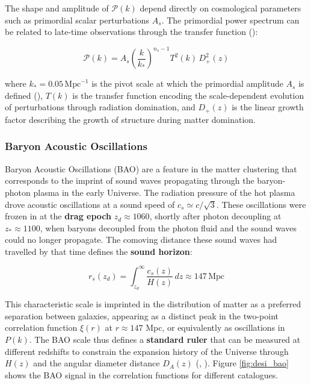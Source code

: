 The shape and amplitude of $\mathcal{P}(k)$ depend directly on cosmological parameters such as primordial scalar perturbations $A_s$. 
The primordial power spectrum can be related to late-time observations through the 
transfer function (\cite{Eisenstein_Hu_1998}):

\begin{equation}
    \mathcal{P}(k) = A_s \left(\frac{k}{k_*}\right)^{n_s - 1} T^2(k)\,D_+^2(z)
\end{equation}

\noindent where $k_* = 0.05\,\text{Mpc}^{-1}$ is the pivot scale at which the primordial amplitude $A_s$ is defined (\cite{Planck_2018_inflation}), $T(k)$ is the transfer 
function encoding the scale-dependent evolution of perturbations through radiation domination, and $D_+(z)$ is the linear growth factor describing the 
growth of structure during matter domination. \\


\subsubsection{Baryon Acoustic Oscillations}

Baryon Acoustic Oscillations (BAO) are a feature in the matter clustering that corresponds to the imprint of sound waves propagating through the baryon-photon 
plasma in the early Universe. The radiation pressure of the hot plasma drove acoustic oscillations at a sound speed of $c_s \simeq c/\sqrt{3}$. These 
oscillations were frozen in at the \textbf{drag epoch} $z_d \approx 1060$, shortly after photon decoupling at $z_* \approx 1100$, when baryons decoupled from the 
photon fluid and the sound waves could no longer propagate. The comoving distance these sound waves had travelled by that time defines the \textbf{sound horizon}:

\begin{equation}
    r_s(z_d) = \int_{z_d}^{\infty} \frac{c_s(z)}{H(z)}\,dz \approx 147\,\text{Mpc}
\end{equation}

This characteristic scale is imprinted in the distribution of matter as a preferred separation between galaxies, appearing as a distinct peak in the two-point 
correlation function $\xi(r)$ at $r \approx 147$ Mpc, or equivalently as oscillations in $P(k)$. The BAO scale thus defines a \textbf{standard ruler} that 
can be measured at different redshifts to constrain the expansion history of the Universe through $H(z)$ and the angular diameter distance $D_A(z)$ 
(\cite{Eisenstein_2005}, \cite{Blake_2003}). Figure \ref{fig:desi_bao} shows the BAO signal in the correlation functions for different catalogues. \\

